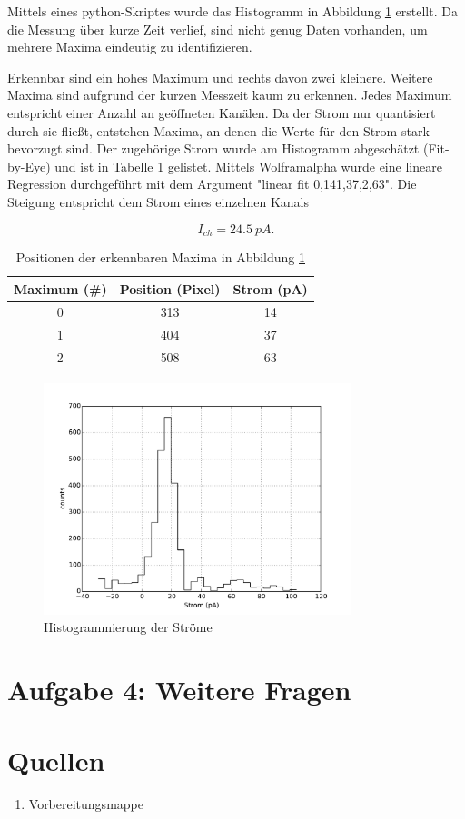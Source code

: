 \documentclass[a4paper,ngerman]{scrartcl}
\begin{document}
Mittels eines python-Skriptes wurde das Histogramm in Abbildung \ref{fig:mehrkanal-histo} erstellt. Da die Messung über kurze Zeit verlief, sind nicht genug Daten vorhanden, um mehrere Maxima eindeutig zu identifizieren. 

Erkennbar sind ein hohes Maximum und rechts davon zwei kleinere. Weitere Maxima sind aufgrund der kurzen Messzeit kaum zu erkennen.
Jedes Maximum entspricht einer Anzahl an geöffneten Kanälen. Da der Strom nur quantisiert durch sie fließt, entstehen Maxima, an denen die Werte für den Strom stark bevorzugt sind.
Der zugehörige Strom wurde am Histogramm abgeschätzt (Fit-by-Eye) und ist in Tabelle \ref{tab:mehrkanal-maxima} gelistet. Mittels Wolframalpha wurde eine lineare Regression durchgeführt mit dem Argument "linear fit {0,14}{1,37},{2,63}". Die Steigung entspricht dem Strom eines einzelnen Kanals

\begin{equation}
I_{ch} = \SI{24.5}{pA} .
\end{equation}



\begin{table}
\centering
\caption{Positionen der erkennbaren Maxima in Abbildung \ref{fig:mehrkanal-histo}}
\label{tab:mehrkanal-maxima}
\begin{tabular}{ccc}
Maximum (\#)	&	Position (Pixel)	&	Strom (pA) \\
\hline
0	&	313	&	14	\\
1	&	404	&	37	\\
2	&	508	&	63	\\
\hline
\end{tabular}
\end{table}

\begin{figure}[tbh!]
\includegraphics[width=0.8\textwidth]{abbildungen/mehrkanal_histo.pdf}
\caption{Histogrammierung der Ströme}
\label{fig:mehrkanal-histo}
\end{figure}




\section{Aufgabe 4: Weitere Fragen}






\section{Quellen}
\begin{enumerate}
\item Vorbereitungsmappe \label{ref:mappe}
\end{enumerate}
\end{document}
